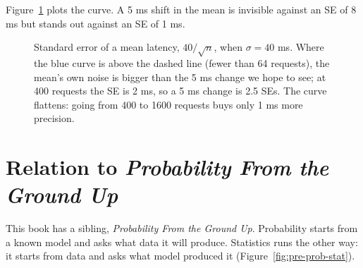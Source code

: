 Figure~\ref{fig:pre-se-curve} plots the curve. A 5 ms shift in the mean is
invisible against an SE of 8 ms but stands out against an SE of 1 ms.

\begin{figure}[H]
\centering
{}
\caption{Standard error of a mean latency, $40/\sqrt{n}$, when $\sigma = 40$ ms.
Where the blue curve is above the dashed line (fewer than 64 requests), the
mean's own noise is bigger than the 5 ms change we hope to see; at 400
requests the SE is 2 ms, so a 5 ms change is 2.5 SEs. The curve flattens:
going from 400 to 1600 requests buys only 1 ms more precision.}
\label{fig:pre-se-curve}
\end{figure}

\section*{Relation to \emph{Probability From the Ground Up}}

This book has a sibling, \emph{Probability From the Ground Up}. Probability
starts from a known model and asks what data it will produce. Statistics runs
the other way: it starts from data and asks what model produced it (Figure~\ref{fig:pre-prob-stat}).

